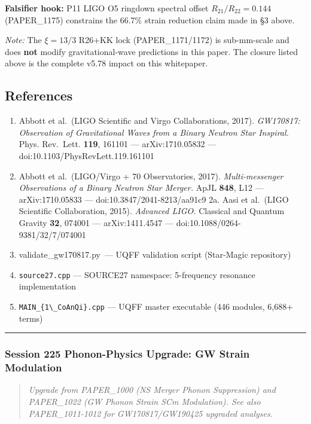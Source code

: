 \documentclass[
  11pt,
]{article}
\providecommand{\tightlist}{%
  \setlength{\itemsep}{0pt}\setlength{\parskip}{0pt}}
\begin{document}
\textbf{Falsifier hook:} P11 LIGO O5 ringdown spectral offset
$R_{21}/R_{22}=0.144$ (PAPER\_1175) constrains the 66.7\% strain
reduction claim made in §3 above.

\emph{Note:} The $\xi=13/3$ R26+KK lock (PAPER\_1171/1172) is
sub-mm-scale and does \textbf{not} modify gravitational-wave predictions
in this paper. The closure listed above is the complete v5.78 impact on
this whitepaper.

\subsection{References}\label{references}

\begin{enumerate}
\def\labelenumi{\arabic{enumi}.}
\tightlist
\item
  Abbott et al.~(LIGO Scientific and Virgo Collaborations, 2017).
  \emph{GW170817: Observation of Gravitational Waves from a Binary
  Neutron Star Inspiral.} Phys. Rev.~Lett. \textbf{119}, 161101 ---
  arXiv:1710.05832 --- doi:10.1103/PhysRevLett.119.161101
\item
  Abbott et al.~(LIGO/Virgo + 70 Observatories, 2017).
  \emph{Multi-messenger Observations of a Binary Neutron Star Merger.}
  ApJL \textbf{848}, L12 --- arXiv:1710.05833 ---
  doi:10.3847/2041-8213/aa91c9 2a. Aasi et al.~(LIGO Scientific
  Collaboration, 2015). \emph{Advanced LIGO.} Classical and Quantum
  Gravity \textbf{32}, 074001 --- arXiv:1411.4547 ---
  doi:10.1088/0264-9381/32/7/074001
\item
  validate\_gw170817.py~--- UQFF validation script (Star-Magic
  repository)
\item
  \texttt{source27.cpp} --- SOURCE27 namespace: 5-frequency resonance
  implementation
\item
  \texttt{MAIN\_\{1\textbackslash{}\_CoAnQi\}.cpp} --- UQFF master
  executable (446 modules, 6,688+ terms)
\end{enumerate}

\begin{center}\rule{0.5\linewidth}{0.5pt}\end{center}

\subsubsection{Session 225 Phonon-Physics Upgrade: GW Strain
Modulation}\label{session-225-phonon-physics-upgrade-gw-strain-modulation}

\begin{quote}
\emph{Upgrade from PAPER\_1000 (NS Merger Phonon Suppression) and
PAPER\_1022 (GW Phonon Strain SCm Modulation). See also PAPER\_1011-1012
for GW170817/GW190425 upgraded analyses.}
\end{quote}
\end{document}
